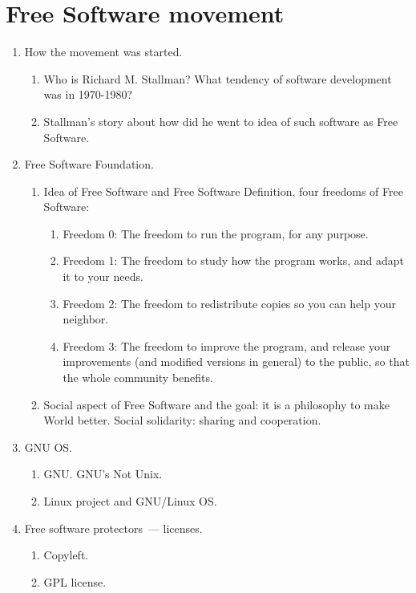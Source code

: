 \documentclass[10pt,a4paper]{article}
\newcommand{\bee}{\begin{enumerate}}
\newcommand{\ene}{\end{enumerate}}
\begin{document}
\section{Free Software movement}
\bee
  \item How the movement was started.
  \bee
    \item Who is Richard M. Stallman? What tendency of software development was in 1970-1980?
    \item Stallman's story about how did he went to idea of such software as Free Software.
  \ene
  \item Free Software Foundation.
  \bee
    \item Idea of Free Software and Free Software Definition, four freedoms of Free Software:
    \bee
      \item[Freedom 0:] The freedom to run the program, for any purpose.
      \item[Freedom 1:] The freedom to study how the program works, and adapt it to your needs.
      \item[Freedom 2:] The freedom to redistribute copies so you can help your neighbor.
      \item[Freedom 3:] The freedom to improve the program, and release your improvements 
      (and modified versions in general) to the public, so that the whole community benefits.
    \ene
    \item Social aspect of Free Software and the goal: it is a philosophy to make World better.
    Social solidarity: sharing and cooperation.
  \ene
  \item GNU OS.
  \bee
    \item GNU. GNU's Not Unix.
    \item Linux project and GNU/Linux OS.
  \ene
  \item Free software protectors~--- licenses.
  \bee
    \item Copyleft.
    \item GPL license.
  \ene
\ene
\end{document}

